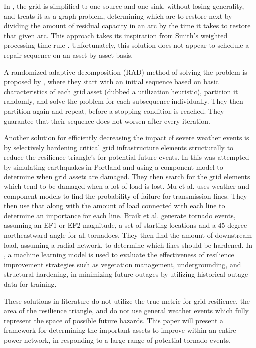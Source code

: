 \documentclass[12pt]{article}
\begin{document}
 In \cite{nurre}, the grid is simplified to one source and one sink, without losing generality, and treats it as a graph problem, determining which arc to restore next by dividing the amount of residual capacity in an arc by the time it takes to restore that given arc.  This approach takes its inspiration from Smith’s weighted processing time rule \cite{smith}. Unfortunately, this solution does not appear to schedule a repair sequence on an asset by asset basis. \par
A randomized adaptive decomposition (RAD) method of solving the problem is proposed by \cite{coffrin2012}, where they start with an initial sequence based on basic characteristics of each grid asset (dubbed a utilization heuristic), partition it randomly, and solve the problem for each subsequence individually. They then partition again and repeat, before a stopping condition is reached. They guarantee that their sequence does not worsen after every iteration. \par
Another solution for efficiently decreasing the impact of severe weather events is  by selectively hardening critical grid infrastructure elements structurally to reduce the resilience triangle’s for potential future events. In \cite{chalishazar} this was attempted by simulating earthquakes in Portland and using a component model to determine when grid assets are damaged. They then search for the grid elements which tend to be damaged when a lot of load is lost. Mu et al. \cite{mu} uses  weather and component models to find the probability of failure for transmission lines. They then use that along with the amount of load connected with each line to determine an importance for each line. Braik et al.  \cite{braik} generate tornado events, assuming an EF1 or EF2 magnitude, a set of starting locations and a 45  degree northeastward angle for all tornadoes. They then find the amount of downstream load, assuming a radial network, to determine which lines should be hardened. In \cite{hughes2024assessing}, a machine learning model is used to evaluate the effectiveness of resilience improvement strategies such as vegetation management, undergrounding, and structural hardening, in minimizing future outages by utilizing historical outage data for training. \par
These solutions in literature do not utilize the true metric for grid resilience, the area of the resilience triangle, and do not use general weather events which fully represent the space of possible future hazards. This paper will present a framework for determining the important assets to improve within an entire power network, in responding to a large range of potential tornado events.
\end{document}
